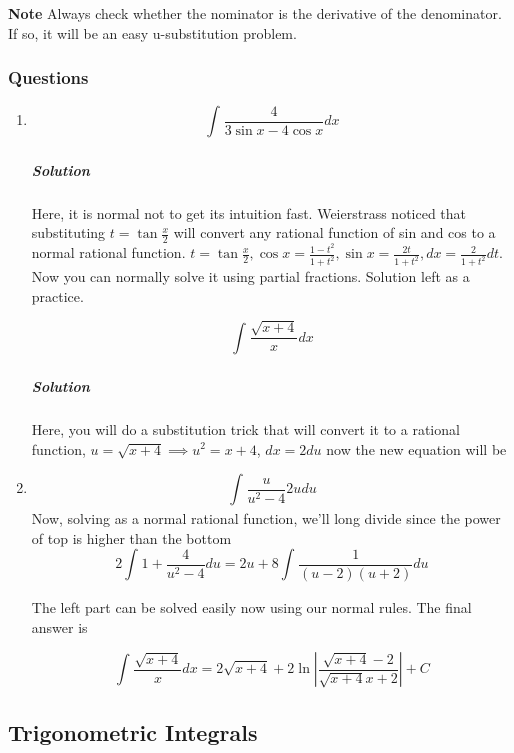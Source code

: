 \documentclass{article}
\begin{document}
	\textbf{Note} Always check whether the nominator is the derivative of the denominator. If so, it will be an easy u-substitution problem. 

	\newpage
	\subsubsection{Questions}

	\begin{enumerate}[1.]
		\item  \[\int^{}_{} \frac{4}{ 3\sin{ x }- 4\cos{ x }  }  dx  \]

			\subparagraph{Solution}
			Here, it is normal not to get its intuition fast. Weierstrass noticed that substituting $ t = \tan{ \frac{x}{2} }  $ will convert any rational function of sin and cos to  a normal rational function. 
			$ t = \tan{ \frac{x}{2} }, \cos{ x } = \frac{ 1-t^2 }{ 1+t^2 }, \sin{ x } = \frac{2t}{1+t^2}, dx = \frac{2}{1+t^2}dt  $. 
			Now you can normally solve it using partial fractions. Solution left as a practice. 

			\[
				\int^{}_{} \frac{\sqrt{x+4}}{x} dx
			\]
			\subparagraph{Solution}
			Here, you will do a substitution trick that will convert it to a rational function, $ u = \sqrt{ x+4 } \implies u^2 = x+4 $, $ dx = 2 du $  now the new equation will be
		\item 	\[ 	\int^{}_{} \frac{u}{u^2-4} 2 u du \]
			Now, solving as a normal rational function, we'll long divide since the power of top is higher than the bottom
			\[
				2\int^{}_{} 1+ \frac{4}{u^2-4} du  = 2u + 8 \int^{}_{} \frac{ 1 }{  (u-2)(u+2)} du  
			\]

			The left part can be solved easily now using our normal rules. The final answer is

			\[
				\int^{}_{} \frac{\sqrt{x+4}}{x} dx = 2 \sqrt{ x+4} +2 \ln | \frac{ \sqrt{ x+4 } -2 }{ \sqrt{ x+4 } x+2 }| + C 
			\]

	\end{enumerate}




	\newpage

	\subsection{Trigonometric Integrals}
\end{document}
